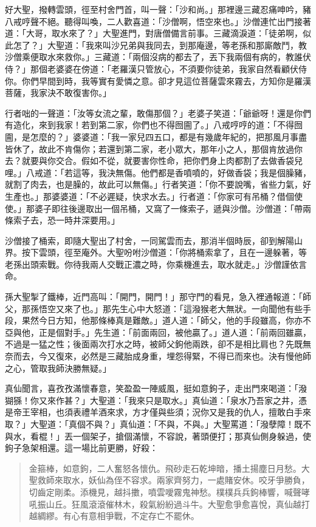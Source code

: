 好大聖，撥轉雲頭，徑至村舍門首，叫一聲：「沙和尚。」那裡邊三藏忍痛呻吟，豬八戒哼聲不絕。聽得叫喚，二人歡喜道：「沙僧啊，悟空來也。」沙僧連忙出門接著道：「大哥，取水來了？」大聖進門，對唐僧備言前事。三藏滴淚道：「徒弟啊，似此怎了？」大聖道：「我來叫沙兄弟與我同去，到那庵邊，等老孫和那廝敵鬥，教沙僧乘便取水來救你。」三藏道：「兩個沒病的都去了，丟下我兩個有病的，教誰伏侍？」那個老婆婆在傍道：「老羅漢只管放心，不須要你徒弟，我家自然看顧伏侍你。你們早間到時，我等實有愛憐之意。卻才見這位菩薩雲來霧去，方知你是羅漢菩薩，我家決不敢復害你。」

行者咄的一聲道：「汝等女流之輩，敢傷那個？」老婆子笑道：「爺爺呀！還是你們有造化，來到我家！若到第二家，你們也不得囫圇了。」八戒哼哼的道：「不得囫圇，是怎麼的？」婆婆道：「我一家兒四五口，都是有幾歲年紀的，把那風月事盡皆休了，故此不肯傷你；若還到第二家，老小眾大，那年小之人，那個肯放過你去？就要與你交合。假如不從，就要害你性命，把你們身上肉都割了去做香袋兒哩。」八戒道：「若這等，我決無傷。他們都是香噴噴的，好做香袋；我是個臊豬，就割了肉去，也是臊的，故此可以無傷。」行者笑道：「你不要說嘴，省些力氣，好生產也。」那婆婆道：「不必遲疑，快求水去。」行者道：「你家可有吊桶？借個使使。」那婆子即往後邊取出一個吊桶，又窩了一條索子，遞與沙僧。沙僧道：「帶兩條索子去，恐一時井深要用。」

沙僧接了桶索，即隨大聖出了村舍，一同駕雲而去，那消半個時辰，卻到解陽山界。按下雲頭，徑至庵外。大聖吩咐沙僧道：「你將桶索拿了，且在一邊躲著，等老孫出頭索戰。你待我兩人交戰正濃之時，你乘機進去，取水就走。」沙僧謹依言命。

孫大聖掣了鐵棒，近門高叫：「開門，開門！」那守門的看見，急入裡通報道：「師父，那孫悟空又來了也。」那先生心中大怒道：「這潑猴老大無狀。一向聞他有些手段，果然今日方知，他那條棒真是難敵。」道人道：「師父，他的手段雖高，你亦不亞與他，正是個對手。」先生道：「前面兩回，被他贏了。」道人道：「前兩回雖贏，不過是一猛之性；後面兩次打水之時，被師父鉤他兩跌，卻不是相比肩也？先既無奈而去，今又復來，必然是三藏胎成身重，埋怨得緊，不得已而來也。決有慢他師之心，管取我師決勝無疑。」

真仙聞言，喜孜孜滿懷春意，笑盈盈一陣威風，挺如意鉤子，走出門來喝道：「潑猢猻！你又來作甚？」大聖道：「我來只是取水。」真仙道：「泉水乃吾家之井，憑是帝王宰相，也須表禮羊酒來求，方才僅與些須；況你又是我的仇人，擅敢白手來取？」大聖道：「真個不與？」真仙道：「不與，不與。」大聖罵道：「潑孽障！既不與水，看棍！」丟一個架子，搶個滿懷，不容說，著頭便打；那真仙側身躲過，使鉤子急架相還。這一場比前更勝，好殺：
\begin{quote}
金箍棒，如意鉤，二人奮怒各懷仇。飛砂走石乾坤暗，播土揚塵日月愁。大聖救師來取水，妖仙為侄不容求。兩家齊努力，一處賭安休。咬牙爭勝負，切齒定剛柔。添機見，越抖擻，噴雲噯霧鬼神愁。樸樸兵兵鉤棒響，喊聲哮吼振山丘。狂風滾滾催林木，殺氣紛紛過斗牛。大聖愈爭愈喜悅，真仙越打越綢繆。有心有意相爭戰，不定存亡不罷休。
\end{quote}

